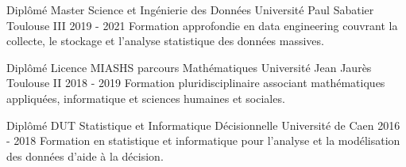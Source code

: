 


\begin{cventries}


\cventry
{Diplômé} %
{Master Science et Ingénierie des Données} %
{Université Paul Sabatier Toulouse III} %
{2019 - 2021} %
{Formation approfondie en data engineering couvrant la collecte, le stockage et l'analyse statistique des données massives.} %



\cventry
{Diplômé} %
{Licence MIASHS parcours Mathématiques} %
{Université Jean Jaurès Toulouse II} %
{2018 - 2019} %
{Formation pluridisciplinaire associant mathématiques appliquées, informatique et sciences humaines et sociales.} %


\cventry
{Diplômé} %
{DUT Statistique et Informatique Décisionnelle} %
{Université de Caen} %
{2016 - 2018} %
{Formation en statistique et informatique pour l'analyse et la modélisation des données d'aide à la décision.} %



\end{cventries}